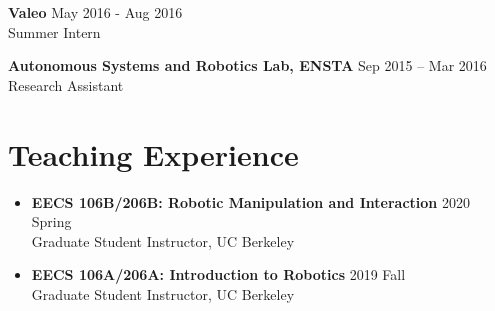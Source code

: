 \documentclass[letterpaper,10pt]{article}
\begin{document}
\hspace*{0.5cm} \textbf{Valeo} \hfill May 2016 - Aug 2016 \\
\hspace*{0.5cm} Summer Intern \\
\hfill

\hspace*{0.5cm} \textbf{Autonomous Systems and Robotics Lab, ENSTA} \hfill Sep 2015 -- Mar 2016 \\
\hspace*{0.5cm} Research Assistant \\

\section{Teaching Experience}
\begin{itemize}
    \item \textbf{EECS 106B/206B:  Robotic Manipulation and Interaction} \hfill 2020 Spring \\ Graduate Student Instructor, UC Berkeley \\
    \item \textbf{EECS 106A/206A:  Introduction to Robotics} \hfill 2019 Fall \\ Graduate Student Instructor, UC Berkeley
\end{itemize}

\end{document}
